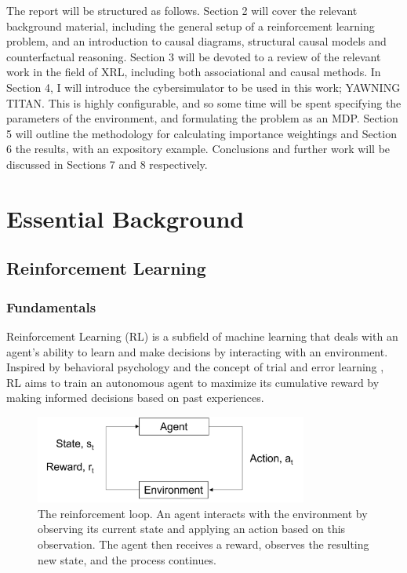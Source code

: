 \documentclass{article}
\begin{document}
The report will be structured as follows. Section 2 will cover the relevant background material, including the general setup of a reinforcement learning problem, and an introduction to causal diagrams, structural causal models and counterfactual reasoning. Section 3 will be devoted to a review of the relevant work in the field of XRL, including both associational and causal methods. In Section 4, I will introduce the cybersimulator to be used in this work; YAWNING TITAN. This is highly configurable, and so some time will be spent specifying the parameters of the environment, and formulating the problem as an MDP. Section 5 will outline the methodology for calculating importance weightings and Section 6 the results, with an expository example. Conclusions and further work will be discussed in Sections 7 and 8 respectively. 
 

\pagebreak


\section{Essential Background}

\subsection{Reinforcement Learning}

\subsubsection{Fundamentals}

Reinforcement Learning (RL) is a subfield of machine learning that deals with an agent's ability to learn and make decisions by interacting with an environment. Inspired by behavioral psychology and the concept of trial and error learning \cite{gershman2017reinforcement}, RL aims to train an autonomous agent to maximize its cumulative reward by making informed decisions based on past experiences. 

\begin{figure}[htp]
    \centering
    \includegraphics[width=0.8\textwidth]{Images/Reinforcement loop.png}
    \caption{The reinforcement loop. An agent interacts with the environment by observing its current state and applying an action based on this observation. The agent then receives a reward, observes the resulting new state, and the process continues. \footnotemark}
    \label{fig:RLloop}
\end{figure}
\end{document}
